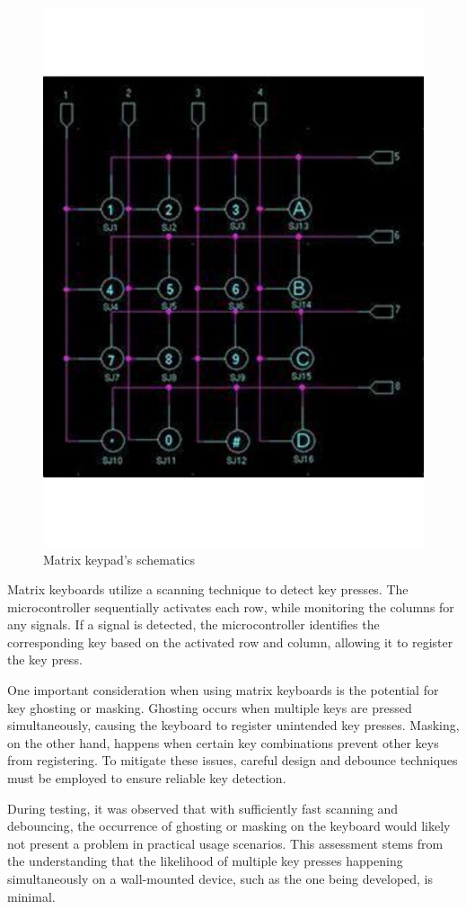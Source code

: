 \begin{figure}[h]
\begin{minipage}[b]{0.45\textwidth}
        \includegraphics[width=.8\textwidth]{Imagenes/Vectorial/matrix_keypad_schematics.pdf}
        \caption{Matrix keypad's schematics}
        \label{fig:matrix_keypad_schematics}
    \end{minipage}
\end{figure}


Matrix keyboards utilize a scanning technique to detect key presses. The microcontroller sequentially activates each row, 
while monitoring the columns for any signals. If a signal is detected, the microcontroller identifies the corresponding key 
based on the activated row and column, allowing it to register the key press.

One important consideration when using matrix keyboards is the potential for key ghosting or masking. Ghosting occurs when 
multiple keys are pressed simultaneously, causing the keyboard to register unintended key presses. Masking, on the other hand, 
happens when certain key combinations prevent other keys from registering. To mitigate these issues, careful design and 
debounce techniques must be employed to ensure reliable key detection.

During testing, it was observed that with sufficiently fast scanning and debouncing, the occurrence of ghosting or masking on 
the keyboard would likely not present a problem in practical usage scenarios. This assessment stems from the understanding that 
the likelihood of multiple key presses happening simultaneously on a wall-mounted device, such as the one being developed, is 
minimal.

